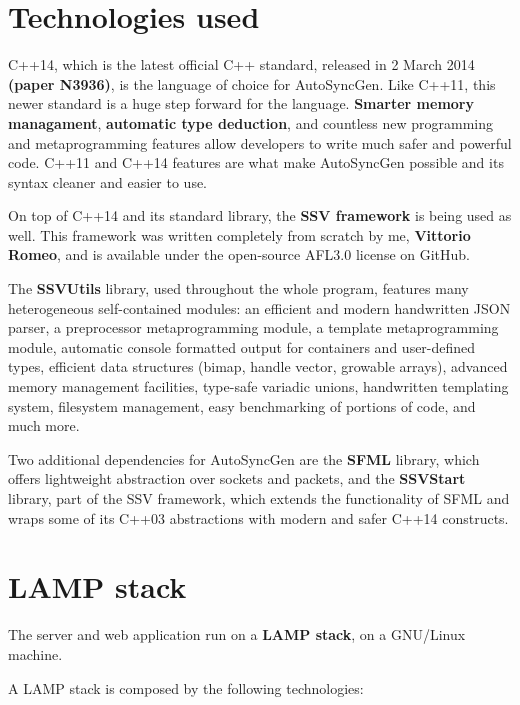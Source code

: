 \documentclass[12pt]{report}
\newcommand{\+}{\discretionary{\mbox{\scriptsize$\hookleftarrow$}}{}{}}
\renewcommand\emph{\textbf}
\begin{document}
            \section{Technologies used}
            C++14, which is the latest official C++ standard, released in 2 March 2014 \emph{(paper N3936)}, is the language of choice for AutoSyncGen.
            Like C++11, this newer standard is a huge step forward for the language. \emph{Smarter memory managament}, \emph{automatic type deduction}, and countless new programming and metaprogramming features allow developers to write much safer and powerful code.
            C++11 and C++14 features are what make AutoSyncGen possible and its syntax cleaner and easier to use.

            On top of C++14 and its standard library, the \emph{SSV framework} is being used as well. This framework was written completely from scratch by me, \emph{Vittorio Romeo}, and is available under the open-source AFL3.0 license on GitHub.

            The \emph{SSVUtils} library, used throughout the whole program, features many heterogeneous self-contained modules: an efficient and modern handwritten JSON parser, a preprocessor metaprogramming module, a template metaprogramming module, automatic console formatted output for containers and user-defined types, efficient data structures (bimap, handle vector, growable arrays), advanced memory management facilities, type-safe variadic unions, handwritten templating system, filesystem management, easy benchmarking of portions of code, and much more.

            Two additional dependencies for AutoSyncGen are the \emph{SFML} library, which offers lightweight abstraction over sockets and packets, and the \emph{SSVStart} library, part of the SSV framework, which extends the functionality of SFML and wraps some of its C++03 abstractions with modern and safer C++14 constructs.

            \section{LAMP stack}
                The server and web application run on a \emph{LAMP stack}, on a GNU/Linux machine.

                A LAMP stack is composed by the following technologies:
\end{document}
